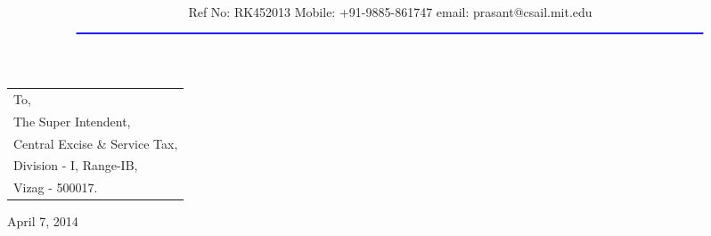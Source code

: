 \documentclass[11pt,A4]{article}
\title{\vspace*{-1.5cm} \centerline{ {\Huge{ \bf \hspace{0cm}{\color{blue} R K Engineering Services}}\vspace*{-0.75cm}}}}
\author{\centerline {\color{blue}{39-24-32, Madhavadhara, I E Post, Visakhapatnam - 7}}\\ \\
 \footnotesize {\color{blue}Ref No: RK452013  \hspace*{3cm}   Mobile: +91-9885-861747  \hspace*{3cm} email: prasant@csail.mit.edu}\\
${\color{blue}\rule{7.0in}{0.5mm}}$}
\date{}
\begin{document}
\maketitle
\thispagestyle{empty}
\begin{flushleft}
{
\noindent \begin{tabular}{l}
\noindent To,\\
\noindent The Super Intendent,\\
\noindent Central Excise \& Service Tax,\\
\noindent  Division - I, Range-IB,\\
\noindent  Vizag - 500017.  
\end{tabular}
}
\end{flushleft}
\vspace*{-2cm}
\begin{flushright} April 7, 2014 \end{flushright} 
\end{document}
